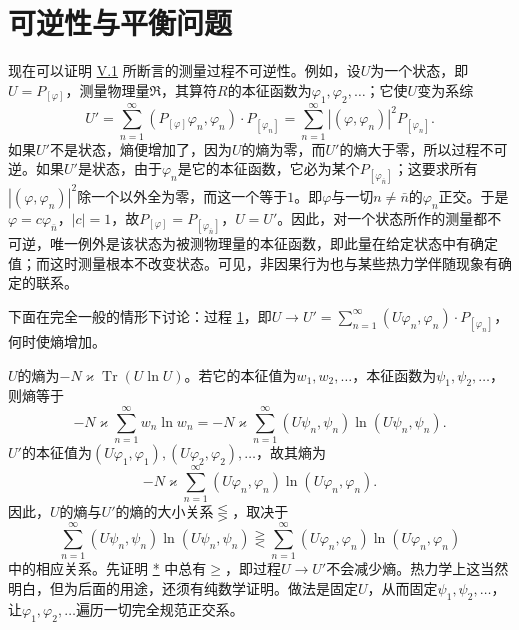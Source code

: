 \documentclass[fontsize=13pt,twoside,openany,headings=normal,parskip=false,bookmarkpackage=false,DIV=calc]{scrbook}
\begin{document}
\section{可逆性与平衡问题}\label{sec:V.3}
现在可以证明 \hyperref[sec:V.1]{V.1} 所断言的测量过程不可逆性。例如，设$U$为一个状态，即$U=P_{[\varphi]}$，测量物理量$\mathfrak R$，其算符$R$的本征函数为$\varphi_1,\allowbreak \varphi_2,\allowbreak \ldots$；它使$U$变为系综
\[
U'=\sum_{n=1}^{\infty}(P_{[\varphi]}\varphi_n,\varphi_n)\cdot P_{[\varphi_n]}
=\sum_{n=1}^{\infty}|(\varphi,\varphi_n)|^2P_{[\varphi_n]}.
\]
如果$U'$不是状态，熵便增加了，因为$U$的熵为零，而$U'$的熵大于零，所以过程不可逆。如果$U'$是状态，由于$\varphi_n$是它的本征函数，它必为某个$P_{[\varphi_{\bar n}]}$；这要求所有$|(\varphi,\allowbreak \varphi_n)|^2$除一个以外全为零，而这一个等于$1$。即$\varphi$与一切$n\ne\bar n$的$\varphi_n$正交。于是$\varphi=c\varphi_{\bar n}$，$|c|=1$，故$P_{[\varphi]}=P_{[\varphi_{\bar n}]}$，$U=U'$。因此，对一个状态所作的测量都不可逆，唯一例外是该状态为被测物理量的本征函数，即此量在给定状态中有确定值；而这时测量根本不改变状态。可见，非因果行为也与某些热力学伴随现象有确定的联系。

下面在完全一般的情形下讨论：过程 \hyperref[eq:V.1.1]{1}，即$U\to U'=\sum_{n=1}^{\infty}(U\varphi_n,\allowbreak \varphi_n)\cdot P_{[\varphi_n]}$，何时使熵增加。

$U$的熵为$-N\varkappa\operatorname{Tr}(U\ln U)$。若它的本征值为$w_1,\allowbreak w_2,\allowbreak \ldots$，本征函数为$\psi_1,\allowbreak \psi_2,\allowbreak \ldots$，则熵等于
\[
-N\varkappa\sum_{n=1}^{\infty}w_n\ln w_n
=-N\varkappa\sum_{n=1}^{\infty}(U\psi_n,\psi_n)\ln(U\psi_n,\psi_n).
\]
$U'$的本征值为$(U\varphi_1,\allowbreak \varphi_1),\allowbreak (U\varphi_2,\allowbreak \varphi_2),\allowbreak \ldots$，故其熵为
\[
-N\varkappa\sum_{n=1}^{\infty}(U\varphi_n,\varphi_n)\ln(U\varphi_n,\varphi_n).
\]
因此，$U$的熵与$U'$的熵的大小关系$\lesseqgtr$，取决于
\begin{equation}\tag{*}\label{eq:V.3.star}
\sum_{n=1}^{\infty}(U\psi_n,\psi_n)\ln(U\psi_n,\psi_n)
\gtreqless\sum_{n=1}^{\infty}(U\varphi_n,\varphi_n)\ln(U\varphi_n,\varphi_n)
\end{equation}
中的相应关系。先证明 \hyperref[eq:V.3.star]{*} 中总有$\geq$，即过程$U\to U'$不会减少熵。热力学上这\hypertarget{origpage-203}{}\label{origpage-203}当然明白，但为后面的用途，还须有纯数学证明。做法是固定$U$，从而固定$\psi_1,\allowbreak \psi_2,\allowbreak \ldots$，让$\varphi_1,\allowbreak \varphi_2,\allowbreak \ldots$遍历一切完全规范正交系。
\end{document}
